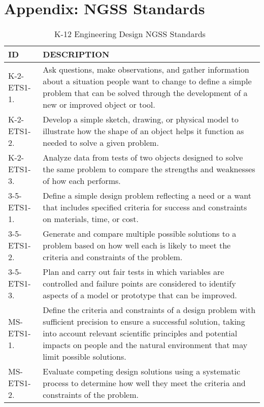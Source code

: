 
\chapter{Appendix: NGSS Standards} %

\label{AppendixNGSS} %


\begin{longtable}{p{1.8cm}p{11cm}}
\caption{K-12 Engineering Design NGSS Standards~\cite{ngss}} \\
\textbf{ID} & \textbf{DESCRIPTION} \\ \hline
K-2-ETS1-1. & Ask questions, make observations, and gather information about a situation people want to change to define a simple problem that can be solved through the development of a new or improved object or tool.\\ \hline
K-2-ETS1-2. & Develop a simple sketch, drawing, or physical model to illustrate how the shape of an object helps it function as needed to solve a given problem.\\ \hline
K-2-ETS1-3. & Analyze data from tests of two objects designed to solve the same problem to compare the strengths and weaknesses of how each performs.\\ \hline
3-5-ETS1-1. & Define a simple design problem reflecting a need or a want that includes specified criteria for success and constraints on materials, time, or cost.\\ \hline
3-5-ETS1-2. & Generate and compare multiple possible solutions to a problem based on how well each is likely to meet the criteria and constraints of the problem.\\ \hline
3-5-ETS1-3. & Plan and carry out fair tests in which variables are controlled and failure points are considered to identify aspects of a model or prototype that can be improved.\\ \hline
MS-ETS1-1. & Define the criteria and constraints of a design problem with sufficient precision to ensure a successful solution, taking into account relevant scientific principles and potential impacts on people and the natural environment that may limit possible solutions.\\ \hline
MS-ETS1-2. & Evaluate competing design solutions using a systematic process to determine how well they meet the criteria and constraints of the problem.\\ \hline

\end{longtable}
